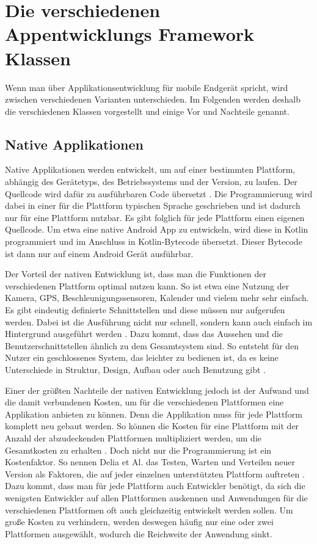 \section{Die verschiedenen Appentwicklungs Framework Klassen}
Wenn man über Applikationsentwicklung für mobile Endgerät spricht, wird zwischen verschiedenen Varianten unterschieden. Im Folgenden werden deshalb die verschiedenen Klassen vorgestellt und einige Vor und Nachteile genannt.
\subsection{Native Applikationen}
Native Applikationen werden entwickelt, um auf einer bestimmten Plattform, abhängig des Gerätetyps, des Betriebssystems und der Version, zu laufen. Der Quellcode wird dafür zu ausführbaren Code übersetzt \cite{IEEE_development_classes}.
Die Programmierung wird dabei in einer für die Plattform typischen Sprache geschrieben und ist dadurch nur für eine Plattform nutzbar. Es gibt folglich für jede Plattform einen eigenen Quellcode. Um etwa eine native Android App zu entwickeln, wird diese in Kotlin programmiert und im Anschluss in Kotlin-Bytecode übersetzt. Dieser Bytecode ist dann nur auf einem Android Gerät ausführbar.

Der Vorteil der nativen Entwicklung ist, dass man die Funktionen der verschiedenen Plattform optimal nutzen kann. So ist etwa eine Nutzung der Kamera, GPS, Beschleunigungssensoren, Kalender und vielem mehr sehr einfach. Es gibt eindeutig definierte Schnittstellen und diese müssen nur aufgerufen werden. Dabei ist die Ausführung nicht nur schnell, sondern kann auch einfach im Hintergrund ausgeführt werden \cite{IEEE_development_classes}. Dazu kommt, dass das Aussehen und die Benutzerschnittstellen ähnlich zu dem Gesamtsystem sind. So entsteht für den Nutzer ein geschlossenes System, das leichter zu bedienen ist, da es keine Unterschiede in Struktur, Design, Aufbau oder auch Benutzung gibt \cite{IEEE_Khackouch_Al}.

Einer der größten Nachteile der nativen Entwicklung jedoch ist der Aufwand und die damit verbundenen Kosten, um für die verschiedenen Plattformen eine Applikation anbieten zu können. Denn die Applikation muss für jede Plattform komplett neu gebaut werden. So können die Kosten für eine Plattform mit der Anzahl der abzudeckenden Plattformen multipliziert werden, um die Gesamtkosten zu erhalten \cite{IEEE_Khackouch_Al}. Doch nicht nur die Programmierung ist ein Kostenfaktor. So nennen Delia et Al. das Testen, Warten und Verteilen neuer Version als Faktoren, die auf jeder einzelnen unterstützten Plattform auftreten \cite{IEEE_development_classes}. Dazu kommt, dass man für jede Plattform auch Entwickler benötigt, da sich die wenigsten Entwickler auf allen Plattformen auskennen und Anwendungen für die verschiedenen Plattformen oft auch gleichzeitig entwickelt werden sollen. Um große Kosten zu verhindern, werden deswegen häufig nur  eine oder zwei Plattformen ausgewählt, wodurch die Reichweite der Anwendung sinkt.


